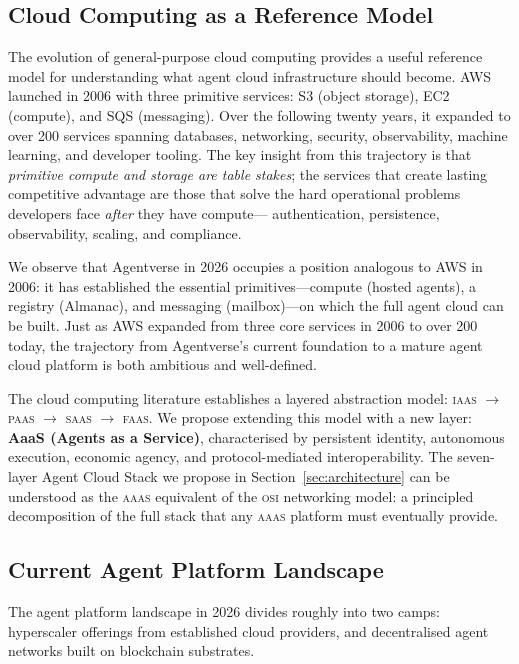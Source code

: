 \documentclass[twoside,11pt]{article}
\begin{document}
\subsection{Cloud Computing as a Reference Model}
\label{subsec:cloud-reference}

The evolution of general-purpose cloud computing provides a useful reference
model for understanding what agent cloud infrastructure should become.  AWS
launched in 2006 with three primitive services: S3 (object storage), EC2
(compute), and SQS (messaging).  Over the following twenty years, it expanded
to over 200 services spanning databases, networking, security, observability,
machine learning, and developer tooling.  The key insight from this trajectory
is that \emph{primitive compute and storage are table stakes}; the services
that create lasting competitive advantage are those that solve the hard
operational problems developers face \emph{after} they have compute---
authentication, persistence, observability, scaling, and compliance.

We observe that Agentverse in 2026 occupies a position analogous to AWS in
2006: it has established the essential primitives---compute (hosted agents),
a registry (Almanac), and messaging (mailbox)---on which the full agent cloud
can be built.  Just as AWS expanded from three core services in 2006 to over
200 today, the trajectory from Agentverse's current foundation to a mature
agent cloud platform is both ambitious and well-defined.

The cloud computing literature establishes a layered abstraction model:
\textsc{iaas} $\to$ \textsc{paas} $\to$ \textsc{saas} $\to$ \textsc{faas}.
We propose extending this model with a new layer: \textbf{AaaS (Agents as a
Service)}, characterised by persistent identity, autonomous execution, economic
agency, and protocol-mediated interoperability.  The seven-layer Agent Cloud
Stack we propose in Section~\ref{sec:architecture} can be understood as the
\textsc{aaas} equivalent of the \textsc{osi} networking model: a principled
decomposition of the full stack that any \textsc{aaas} platform must eventually
provide.

\subsection{Current Agent Platform Landscape}
\label{subsec:platforms}

The agent platform landscape in 2026 divides roughly into two camps:
hyperscaler offerings from established cloud providers, and decentralised agent
networks built on blockchain substrates.
\end{document}
